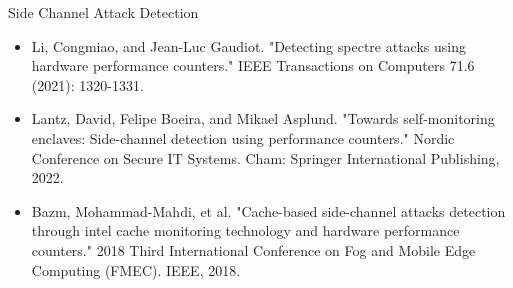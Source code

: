 \documentclass[aspectratio=169]{beamer}
\begin{document}
\begin{frame}{Side Channel Attack Detection}
    \begin{itemize}
        \item Li, Congmiao, and Jean-Luc Gaudiot. "Detecting spectre attacks using hardware performance counters." {\footnotesize{IEEE Transactions on Computers 71.6 (2021): 1320-1331.}}
        \item Lantz, David, Felipe Boeira, and Mikael Asplund. "Towards self-monitoring enclaves: Side-channel detection using performance counters." {\footnotesize{Nordic Conference on Secure IT Systems. Cham: Springer International Publishing, 2022.}}
        \item Bazm, Mohammad-Mahdi, et al. "Cache-based side-channel attacks detection through intel cache monitoring technology and hardware performance counters." {\footnotesize{2018 Third International Conference on Fog and Mobile Edge Computing (FMEC). IEEE, 2018.}}
    \end{itemize}
\end{frame}
\end{document}
